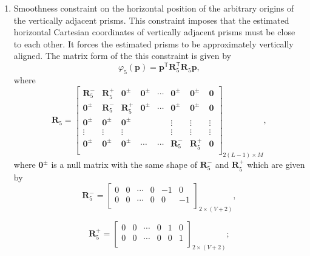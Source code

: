 \begin{enumerate}
\item Smoothness constraint on the horizontal position of the arbitrary origins of the vertically adjacent prisms. This constraint imposes that the estimated horizontal Cartesian coordinates of vertically adjacent prisms must be close to each other. It forces the estimated prisms to be approximately vertically aligned. The matrix form of the this constraint is given by
\begin{equation}
\varphi_{5}(\textbf{p}) = \textbf{p}^\mathsf{T}\textbf{R}^\mathsf{T}_{5}\textbf{R}_{5}\textbf{p} ,
\end{equation}
where
\begin{equation}
\mathbf{R}_{5} = 
\begin{bmatrix}
\mathbf{R}^{-}_{5} & \mathbf{R}^{+}_{5} & \mathbf{0}^{\pm} & \mathbf{0}^{\pm} & \cdots & \mathbf{0}^{\pm} & \mathbf{0}^{\pm} & \mathbf{0}\\
\mathbf{0}^{\pm} & \mathbf{R}^{-}_{5} & \mathbf{R}^{+}_{5} & \mathbf{0}^{\pm} & \cdots & \mathbf{0}^{\pm} & \mathbf{0}^{\pm} & \mathbf{0}\\
\mathbf{0}^{\pm} & \mathbf{0}^{\pm} & \mathbf{0}^{\pm} &  &  & \vdots & \vdots & \vdots\\
\vdots & \vdots & \vdots &  &  & \vdots & \vdots & \vdots\\
\mathbf{0}^{\pm} & \mathbf{0}^{\pm} & \mathbf{0}^{\pm} & \cdots & \cdots & \mathbf{R}^{-}_{5} & \mathbf{R}^{+}_{5} & \mathbf{0}\\
\end{bmatrix}_{2(L-1)\times M},
\end{equation}
where $\mathbf{0}^{\pm}$ is a null matrix with the same shape of $\mathbf{R}^{-}_{5}$ and $\mathbf{R}^{+}_{5}$ which are given by
\begin{equation}
\textbf{R}^{-}_{5} = 
\begin{bmatrix}
0 & 0 & \cdots & 0 & -1 & 0 \\
0 & 0 & \cdots & 0 & 0 & -1 \\
\end{bmatrix}_{2\times (V+2)},
\end{equation}

\begin{equation}
\textbf{R}^{+}_{5} = 
\begin{bmatrix}
0 & 0 & \cdots & 0 & 1 & 0 \\
0 & 0 & \cdots & 0 & 0 & 1 \\
\end{bmatrix}_{2\times (V+2)};
\end{equation}


\end{enumerate}
